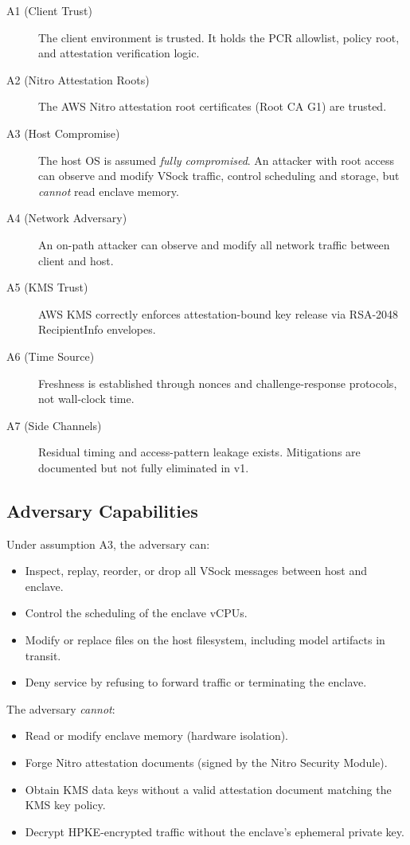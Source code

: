 \documentclass[11pt,a4paper]{article}
\begin{document}
\begin{description}
  \item[A1 (Client Trust)] The client environment is trusted. It holds the PCR allowlist, policy root, and attestation verification logic.
  \item[A2 (Nitro Attestation Roots)] The AWS Nitro attestation root certificates (Root CA G1) are trusted.
  \item[A3 (Host Compromise)] The host OS is assumed \emph{fully compromised}. An attacker with root access can observe and modify VSock traffic, control scheduling and storage, but \emph{cannot} read enclave memory.
  \item[A4 (Network Adversary)] An on-path attacker can observe and modify all network traffic between client and host.
  \item[A5 (KMS Trust)] AWS KMS correctly enforces attestation-bound key release via RSA-2048 RecipientInfo envelopes.
  \item[A6 (Time Source)] Freshness is established through nonces and challenge-response protocols, not wall-clock time.
  \item[A7 (Side Channels)] Residual timing and access-pattern leakage exists. Mitigations are documented but not fully eliminated in v1.
\end{description}

\subsection{Adversary Capabilities}

Under assumption A3, the adversary can:
\begin{itemize}
  \item Inspect, replay, reorder, or drop all VSock messages between host and enclave.
  \item Control the scheduling of the enclave vCPUs.
  \item Modify or replace files on the host filesystem, including model artifacts in transit.
  \item Deny service by refusing to forward traffic or terminating the enclave.
\end{itemize}

The adversary \emph{cannot}:
\begin{itemize}
  \item Read or modify enclave memory (hardware isolation).
  \item Forge Nitro attestation documents (signed by the Nitro Security Module).
  \item Obtain KMS data keys without a valid attestation document matching the KMS key policy.
  \item Decrypt HPKE-encrypted traffic without the enclave's ephemeral private key.
\end{itemize}
\end{document}
